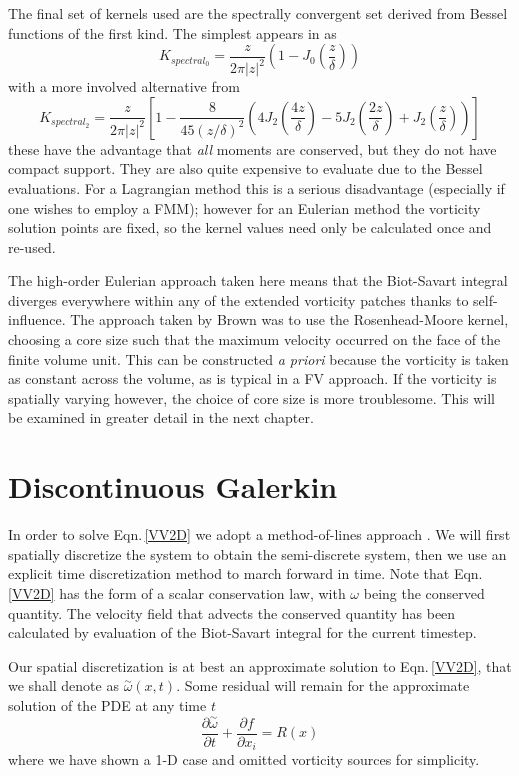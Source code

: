 \documentclass[letterpaper,12pt]{report}
\newcommand{\ben}[1]{\begin{equation}\label{#1}}
\newcommand{\ee}{\end{equation}}
\newcommand{\aomega}{\overset{\sim}{\omega}}				%
\begin{document}
The final set of kernels used are the spectrally convergent set derived from Bessel functions of the first kind. The simplest appears in \cite{WL} as
\ben{PSkern0}  K_{spectral_0}= \frac{z}{2 \pi |z|^2} (1-J_0(\frac{z}{\delta})) \ee
with a more involved alternative from \cite{HaldReview}
\ben{PSkern2}  K_{spectral_2}= \frac{z}{2 \pi |z|^2} \left[1-\frac{8}{45(z/\delta)^2}(4J_2(\frac{4z}{\delta})-5J_2(\frac{2z}{\delta})+J_2(\frac{z}{\delta}))\right] \ee
these have the advantage that \textit{all} moments are conserved, but they do not have compact support. They are also quite expensive to evaluate due to the Bessel evaluations. For a Lagrangian method this is a serious disadvantage (especially if one wishes to employ a FMM); however for an Eulerian method the vorticity solution points are fixed, so the kernel values need only be calculated once and re-used.

The high-order Eulerian approach taken here means that the Biot-Savart integral diverges everywhere within any of the extended vorticity patches thanks to self-influence. The approach taken by Brown \cite{Brown2004} was to use the Rosenhead-Moore kernel, choosing a core size such that the maximum velocity occurred on the face of the finite volume unit. This can be constructed \textit{a priori} because the vorticity is taken as constant across the volume, as is typical in a FV approach. If the vorticity is spatially varying however, the choice of core size is more troublesome. This will be examined in greater detail in the next chapter.

\section{Discontinuous Galerkin}
In order to solve Eqn.\,\eqref{VV2D} we adopt a method-of-lines approach \cite{RKDG}. We will first spatially discretize the system to obtain the semi-discrete system, then we use an explicit time discretization method to march forward in time. Note that Eqn.\,\eqref{VV2D} has the form of a scalar conservation law, with $\omega$ being the conserved quantity. The velocity field that advects the conserved quantity has been calculated by evaluation of the Biot-Savart integral for the current timestep.

Our spatial discretization is at best an approximate solution to Eqn.\,\eqref{VV2D}, that we shall denote as $\aomega(x,t)$. Some residual will remain for the approximate solution of the PDE at any time $t$
\ben{VV2D} \frac{\partial \aomega}{\partial t} + \frac{\partial f}{\partial x_i} = R(x)\ee
where we have shown a 1-D case and omitted vorticity sources for simplicity.
\end{document}
